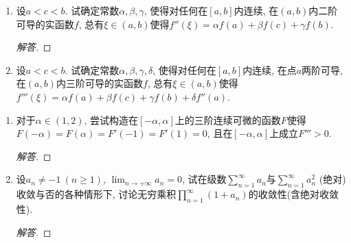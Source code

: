 \begin{5a}
\begin{enumerate}
\item 设\(a<c<b\). 试确定常数\(\alpha,\beta,\gamma\), 
使得对任何在\([a,b]\)内连续, 在\((a,b)\)内二阶可导的实函数\(f\), 
总有\(\xi\in(a,b)\)使得\(f''(\xi)=\alpha f(a)+\beta f(c)+\gamma f(b).\)
\begin{proof}[解答]
	
\end{proof}
\item 设\(a<c<b\). 试确定常数\(\alpha,\beta,\gamma,\delta\), 
使得对任何在\([a,b]\)内连续, 在点\(a\)两阶可导, 在\((a,b)\)内三阶可导的实函数\(f\), 
总有\(\xi\in(a,b)\)使得\(f'''(\xi)=\alpha f(a)+\beta f(c)+\gamma f(b)+\delta f''(a)\).
\end{enumerate}
\end{5a}
\begin{5b}
\begin{enumerate}
\item 对于\(\alpha\in (1,2)\), 尝试构造在\([-\alpha,\alpha]\)上的三阶连续可微的函数\(F\)使得\(F(-\alpha)=F(\alpha)=F'(-1)=F'(1)=0\), 且在\([-\alpha,\alpha]\)上成立\(F'''>0.\)
\begin{proof}[解答]

\end{proof}
\item 设\(a_n\ne -1\ (n\geqslant 1)\), \(\lim_{n\rightarrow+\infty}a_n=0\), 
试在级数\(\sum_{n=1}^{\infty}a_n\)与\(\sum_{n=1}^{\infty}a_n^2\) (绝对)收敛与否的各种情形下, 讨论无穷乘积\(\prod_{n=1}^{\infty}(1+a_n)\)的收敛性(含绝对收敛性).
\begin{proof}[解答]


\end{proof}
\end{enumerate}
\end{5b}
